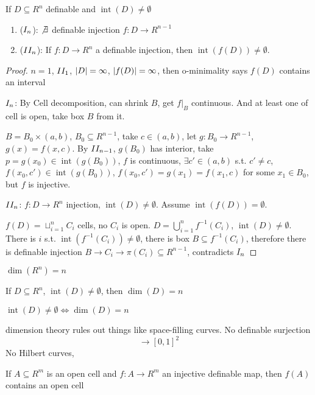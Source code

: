 \documentclass[11pt]{article}
\DeclareMathOperator{\tint}{\text{int}}
\begin{document}
\begin{theorem}[]
If \(D\subseteq R^n\) definable and \(\tint(D)\neq\emptyset\)
\begin{enumerate}
\item (\(\rom{1}_n\)): \(\not\exists\) definable injection \(f:D\to R^{n-1}\)
\item (\(\rom{2}_n\)): If \(f:D\to R^n\) a definable injection, then \(\tint(f(D))\neq\emptyset\).
\end{enumerate}
\end{theorem}

\begin{proof}
\(n=1\), \(\rom{2}_1\), \(\abs{D}=\infty\), \(\abs{f(D)}=\infty\), then o-minimality says \(f(D)\) contains
an interval

\(\rom{1}_n\): By Cell decomposition, can shrink \(B\), get \(f|_B\) continuous. And at least
one of cell is open, take box \(B\) from it.

\(B=B_0\times(a,b)\), \(B_0\subseteq R^{n-1}\), take \(c\in(a,b)\), let \(g:B_0\to R^{n-1}\), \(g(x)=f(x,c)\).
By \(\rom{2}_{n-1}\), \(g(B_0)\) has interior, take \(p=g(x_0)\in\tint(g(B_0))\), \(f\) is
continuous, \(\exists c'\in(a,b)\)
s.t. \(c'\neq c\), \(f(x_0,c')\in\tint(g(B_0))\), \(f(x_0,c')=g(x_1)=f(x_1,c)\) for some \(x_1\in B_0\),
but \(f\) is injective.

\(\rom{2}_n\): \(f:D\to R^n\) injection, \(\tint(D)\neq\emptyset\). Assume \(\tint(f(D))=\emptyset\).

\(f(D)=\sqcup_{i=1}^nC_i\) cells, no \(C_i\) is open. \(D=\bigcup_{i=1}^nf^{-1}(C_i)\), \(\tint(D)\neq\emptyset\). There
is \(i\) s.t. \(\tint(f^{-1}(C_i))\neq\emptyset\), there is box \(B\subseteq f^{-1}(C_i)\), therefore there is
definable injection \(B\to C_i\to\pi(C_i)\subseteq R^{n-1}\), contradicts \(\rom{1}_n\)
\end{proof}

\begin{corollary}[]
\(\dim(R^n)=n\)

If \(D\subseteq R^n\), \(\tint(D)\neq\emptyset\), then \(\dim(D)=n\)

\(\tint(D)\neq\emptyset\Leftrightarrow\dim(D)=n\)
\end{corollary}

dimension theory rules out things like space-filling curves. No definable surjection
\begin{equation*}
[0,1]\to[0,1]^2
\end{equation*}
No Hilbert curves,


\begin{lemma}[]
\label{4.1.2}
If \(A\subseteq R^m\) is an open cell and \(f:A\to R^m\) an injective definable map, then \(f(A)\) contains
an open cell
\end{lemma}
\end{document}
